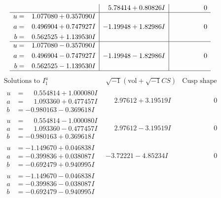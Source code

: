 \documentclass[1p]{elsarticle_modified}
\theoremstyle{definition}
\newcommand{\I}{\sqrt{-1}}
\begin{document}
$$\begin{array}{c|c|c}
 & \phantom{-}5.78414 + 0.80826 I & \phantom{-0.000000 } 0 \\ \hline\begin{aligned}
u &= \phantom{-}1.077080 + 0.357090 I \\
a &= \phantom{-}0.496904 + 0.747927 I \\
b &= \phantom{-}0.562525 + 1.139530 I\end{aligned}
 & -1.19948 + 1.82986 I & \phantom{-0.000000 } 0 \\ \hline\begin{aligned}
u &= \phantom{-}1.077080 - 0.357090 I \\
a &= \phantom{-}0.496904 - 0.747927 I \\
b &= \phantom{-}0.562525 - 1.139530 I\end{aligned}
 & -1.19948 - 1.82986 I & \phantom{-0.000000 } 0\\
 \hline 
 \end{array}$$\newpage$$\begin{array}{c|c|c}  
\text{Solutions to }I^u_{1}& \I (\text{vol} + \sqrt{-1}CS) & \text{Cusp shape}\\
 \hline 
\begin{aligned}
u &= \phantom{-}0.554814 + 1.000080 I \\
a &= \phantom{-}1.093360 + 0.477457 I \\
b &= -0.980163 - 0.369618 I\end{aligned}
 & \phantom{-}2.97612 + 3.19519 I & \phantom{-0.000000 } 0 \\ \hline\begin{aligned}
u &= \phantom{-}0.554814 - 1.000080 I \\
a &= \phantom{-}1.093360 - 0.477457 I \\
b &= -0.980163 + 0.369618 I\end{aligned}
 & \phantom{-}2.97612 - 3.19519 I & \phantom{-0.000000 } 0 \\ \hline\begin{aligned}
u &= -1.149670 + 0.046838 I \\
a &= -0.399836 + 0.038087 I \\
b &= -0.692479 + 0.940995 I\end{aligned}
 & -3.72221 - 4.85234 I & \phantom{-0.000000 } 0 \\ \hline\begin{aligned}
u &= -1.149670 - 0.046838 I \\
a &= -0.399836 - 0.038087 I \\
b &= -0.692479 - 0.940995 I\end{aligned}

\end{array}$$
\end{document}
